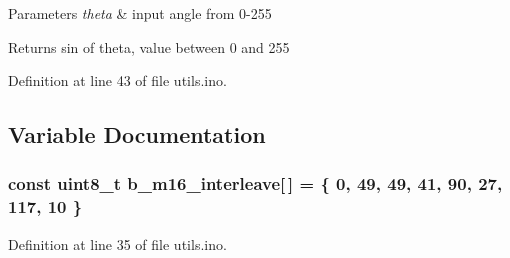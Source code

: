 \begin{DoxyParams}{Parameters}
{\em theta} & input angle from 0-\/255 \\
\hline
\end{DoxyParams}
\begin{DoxyReturn}{Returns}
sin of theta, value between 0 and 255 
\end{DoxyReturn}


Definition at line 43 of file utils.\+ino.



\subsection{Variable Documentation}
\subsubsection[{\texorpdfstring{b\+\_\+m16\+\_\+interleave}{b_m16_interleave}}]{\setlength{\rightskip}{0pt plus 5cm}const uint8\+\_\+t b\+\_\+m16\+\_\+interleave\mbox{[}$\,$\mbox{]} = \{ 0, 49, 49, 41, 90, 27, 117, 10 \}}\hypertarget{group___fast_l_e_d_gadc654138105ff193df0fbc7a0c21806c}{}\label{group___fast_l_e_d_gadc654138105ff193df0fbc7a0c21806c}


Definition at line 35 of file utils.\+ino.

